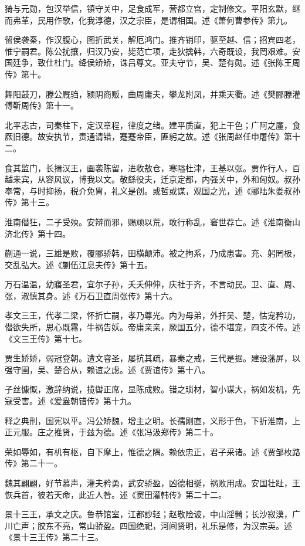 \documentclass[]{article}
\begin{document}
猗与元勋，包汉举信，镇守关中，足食成军，营都立宫，定制修文。平阳玄默，继而弗革，民用作歌，化我淳德，汉之宗臣，是谓相国。述《萧何曹参传》第九。

留侯袭秦，作汉腹心，图折武关，解厄鸿门。推齐销印，驱至越、信；招宾四老，惟宁嗣君。陈公扰攘，归汉乃安，毙范亡项，走狄擒韩，六奇既设，我罔艰难。安国廷争，致仕杜门。绛侯矫矫，诛吕尊文。亚夫守节，吴、楚有勋。述《张陈王周传》第十。

舞阳鼓刀，滕公厩驺，颍阴商贩，曲周庸夫，攀龙附凤，并乘天衢。述《樊郦滕灌傅靳周传》第十一。

北平志古，司秦柱下，定汉章程，律度之绪。建平质直，犯上干色；广阿之廑，食厥旧德。故安执节，责通请错，蹇蹇帝臣，匪躬之故。述《张周赵任申屠传》第十二。

食其监门，长揖汉王，画袭陈留，进收敖仓，寒隘杜津，王基以张。贾作行人，百越来宾，从容风议，博我以文。敬繇役夫，迁京定都，内强关中，外和匈奴。叔孙奉常，与时抑扬，税介免胄，礼义是创。或哲或谋，观国之光，述《郦陆朱娄叔孙传》第十三。

淮南僣狂，二子受殃。安辩而邪，赐顽以荒，敢行称乱，窘世荐亡。述《淮南衡山济北传》第十四。

蒯通一说，三雄是败，覆郦骄韩，田横颠沛。被之拘系，乃成患害。充、躬罔极，交乱弘大。述《蒯伍江息夫传》第十五。

万石温温，幼寤圣君，宜尔子孙，夭夭伸伸，庆社于齐，不言动民。卫、直、周、张，淑慎其身。述《万石卫直周张传》第十六。

孝文三王，代孝二梁，怀折亡嗣，孝乃尊光。内为母弟，外扞吴、楚，怙宠矜功，僣欲失所，思心既霿，牛祸告妖。帝庸亲亲，厥国五分，德不堪宠，四支不传。述《文三王传》第十七。

贾生娇娇，弱冠登朝。遭文睿圣，屡抗其疏，暴秦之戒，三代是据。建设藩屏，以强守圉，吴、楚合从，赖谊之虑。述《贾谊传》第十八。

子丝慷慨，激辞纳说，揽辔正席，显陈成败。错之琐材，智小谋大，祸如发机，先寇受害。述《爰盎朝错传》第十九。

释之典刑，国宪以平。冯公矫魏，增主之明。长孺刚直，义形于色，下折淮南，上正元服。庄之推贤，于兹为德。述《张冯汲郑传》第二十。

荣如辱如，有机有枢，自下摩上，惟德之隅。赖依忠正，君子采诸。述《贾邹枚路传》第二十一。

魏其翩翩，好节慕声，灌夫矜勇，武安骄盈，凶德相挻，祸败用成。安国壮趾，王恢兵首，彼若天命，此近人咎。述《窦田灌韩传》第二十二。

景十三王，承文之庆。鲁恭馆室，江都訬轻；赵敬险诐，中山淫醟；长沙寂漠，广川亡声；胶东不亮，常山骄盈。四国绝祀，河间贤明，礼乐是修，为汉宗英。述《景十三王传》第二十三。
\end{document}
